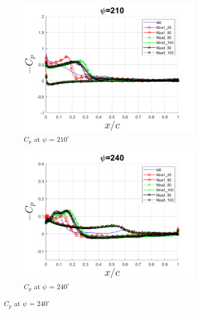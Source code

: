 \begin{figure}[H]
\begin{subfigure}[b]{0.475\textwidth}
\includegraphics[width=1\textwidth]{figures/zonal_adapt_results/Cp/phase_210.png}
\caption{ $C_p$ at $\psi$ = $210^\circ$}
\label{fig:zonal_Cp_210}
\end{subfigure}
\begin{subfigure}[b]{0.475\textwidth}
\centering
\includegraphics[width=1\textwidth]{figures/zonal_adapt_results/Cp/phase_240.png}
\caption{ $C_p$ at $\psi$ = $240^\circ$}
\label{fig:zonal_Cp_240}
\label{fig:zonal_Cp_plots_LEV}
\end{subfigure}
\end{figure}



